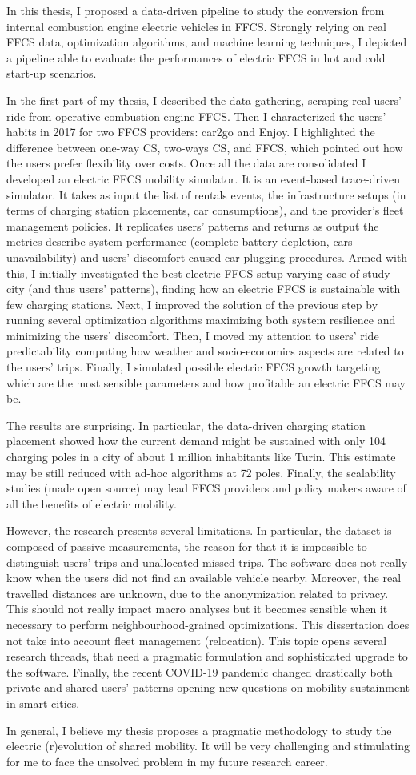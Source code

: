 In this thesis, I proposed a data-driven pipeline to study the conversion from internal combustion engine electric vehicles in FFCS. Strongly relying on real FFCS data, optimization algorithms, and machine learning techniques, I depicted a pipeline able to evaluate the performances of electric FFCS in hot and cold start-up scenarios. 

In the first part of my thesis, I described the data gathering, scraping real users' ride from operative combustion engine FFCS. Then I characterized the users' habits in 2017 for two FFCS providers: car2go and Enjoy. I highlighted the difference between one-way CS, two-ways CS, and FFCS, which pointed out how the users prefer flexibility over costs. Once all the data are consolidated I developed an electric FFCS mobility simulator. It is an event-based trace-driven simulator. It takes as input the list of rentals events, the infrastructure setups (in terms of charging station placements, car consumptions), and the provider's fleet management policies. It replicates users' patterns and returns as output the metrics describe system performance (complete battery depletion, cars unavailability) and users' discomfort caused car plugging procedures. Armed with this, I initially investigated the best electric FFCS setup varying case of study city (and thus users' patterns), finding how an electric FFCS is sustainable with few charging stations. Next, I improved the solution of the previous step by running several optimization algorithms maximizing both system resilience and minimizing the users' discomfort. Then, I moved my attention to users' ride predictability computing how weather and socio-economics aspects are related to the users' trips. Finally, I simulated possible electric FFCS growth targeting which are the most sensible parameters and how profitable an electric FFCS may be.

The results are surprising. In particular, the data-driven charging station placement showed how the current demand might be sustained with only 104 charging poles in a city of about 1 million inhabitants like Turin. This estimate may be still reduced with ad-hoc algorithms at 72 poles. Finally, the scalability studies (made open source) may lead FFCS providers and policy makers aware of all the benefits of electric mobility.

However, the research presents several limitations. In particular, the dataset is composed of passive measurements, the reason for that it is impossible to distinguish users' trips and unallocated missed trips. The software does not really know when the users did not find an available vehicle nearby. Moreover, the real travelled distances are unknown, due to the anonymization related to privacy. This should not really impact macro analyses but it becomes sensible when it necessary to perform neighbourhood-grained optimizations. This dissertation does not take into account fleet management (relocation). This topic opens several research threads, that need a pragmatic formulation and sophisticated upgrade to the software. Finally, the recent COVID-19 pandemic changed drastically both private and shared users' patterns opening new questions on mobility sustainment in smart cities.

In general, I believe my thesis proposes a pragmatic methodology to study the electric (r)evolution of shared mobility. It will be very challenging and stimulating for me to face the unsolved problem in my future research career.

